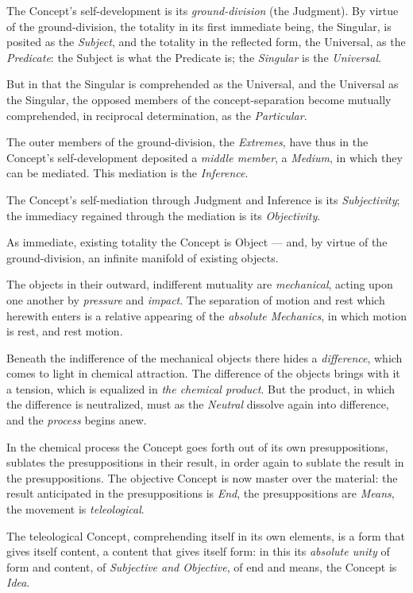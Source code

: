 \documentclass[12pt]{book}
\begin{document}
The Concept's self-development is its \emph{ground-division} (the
Judgment). By virtue of the ground-division, the totality in its
first immediate being, the Singular, is posited as the
\emph{Subject}, and the totality in the reflected form, the
Universal, as the \emph{Predicate}: the Subject is what the Predicate
is; the \emph{Singular} is the \emph{Universal}.

But in that the Singular is comprehended as the Universal, and the
Universal as the Singular, the opposed members of the
concept-separation become mutually comprehended, in reciprocal
determination, as the \emph{Particular}.

The outer members of the ground-division, the \emph{Extremes}, have
thus in the Concept's self-development deposited a \emph{middle
member}, a \emph{Medium}, in which they can be mediated. This
mediation is the \emph{Inference}.

The Concept's self-mediation through Judgment and Inference is its
\emph{Subjectivity}; the immediacy regained through the mediation is
its \emph{Objectivity}.

As immediate, existing totality the Concept is Object --- and, by
virtue of the ground-division, an infinite manifold of existing
objects.

The objects in their outward, indifferent mutuality are
\emph{mechanical}, acting upon one another by \emph{pressure} and
\emph{impact}. The separation of motion and rest which herewith
enters is a relative appearing of the \emph{absolute Mechanics}, in
which motion is rest, and rest motion.

Beneath the indifference of the mechanical objects there hides a
\emph{difference}, which comes to light in chemical attraction. The
difference of the objects brings with it a tension, which is
equalized in \emph{the chemical product}. But the product, in which
the difference is neutralized, must as the \emph{Neutral} dissolve
again into difference, and the \emph{process} begins anew.

In the chemical process the Concept goes forth out of its own
presuppositions, sublates the presuppositions in their result, in
order again to sublate the result in the presuppositions. The
objective Concept is now master over the material: the result
anticipated in the presuppositions is \emph{End}, the presuppositions
are \emph{Means}, the movement is \emph{teleological}.

The teleological Concept, comprehending itself in its own elements,
is a form that gives itself content, a content that gives itself
form: in this its \emph{absolute unity} of form and content, of
\emph{Subjective and Objective}, of end and means, the Concept is
\emph{Idea}.
\end{document}
